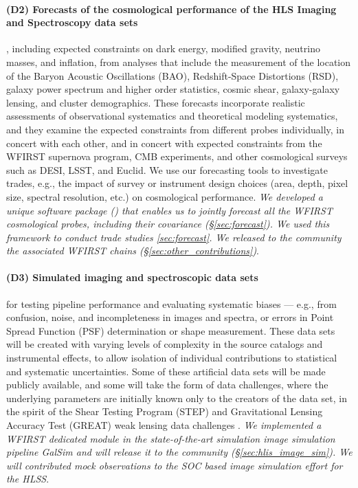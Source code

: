 \paragraph*{(D2) Forecasts of the cosmological performance of the HLS Imaging
and Spectroscopy data sets}, including expected constraints on dark energy,
modified gravity, neutrino masses, and inflation, from analyses that include the
measurement of the location of the Baryon Acoustic Oscillations (BAO),
Redshift-Space Distortions (RSD), galaxy power spectrum and higher order
statistics, cosmic shear, galaxy-galaxy lensing, and cluster demographics. These
forecasts incorporate realistic assessments of observational systematics and
theoretical modeling systematics, and they examine the expected constraints from
different probes individually, in concert with each other, and in concert with
expected constraints from the WFIRST supernova program, CMB experiments, and
other cosmological surveys such as DESI, LSST, and Euclid. We use our
forecasting tools to investigate trades, e.g., the impact of survey or
instrument design choices (area, depth, pixel size, spectral resolution, etc.)
on cosmological performance. \emph{We developed a unique software package (\CoLi) that
enables us to jointly forecast all the WFIRST cosmological probes, including
their covariance (\S \ref{sec:forecast}). We used this framework to conduct trade studies \ref{sec:forecast}. We released to the community the
associated WFIRST chains (\S \ref{sec:other_contributions})}.

\paragraph*{(D3) Simulated imaging and spectroscopic data sets} for testing pipeline
performance and evaluating systematic biases --- e.g., from confusion,
noise, and incompleteness in images and spectra, or errors in Point
Spread Function (PSF) determination or shape measurement.
These data sets will be created with varying levels of complexity
in the source catalogs and instrumental effects, to allow isolation
of individual contributions to statistical and systematic uncertainties.
Some of these artificial data sets will be made publicly available,
and some will take the form of data challenges, where the underlying
parameters are initially known only to the creators of the data set,
in the spirit of the Shear Testing Program (STEP) and Gravitational
Lensing Accuracy Test (GREAT) weak lensing data
challenges \cite{Heymans2006, Massey2007, Bridle2010, Kitching2012, Mandelbaum2015}. \emph{We implemented a WFIRST dedicated module in the state-of-the-art simulation image simulation pipeline GalSim and will release it to the community (\S \ref{sec:hlis_image_sim}). We will contributed mock observations to the SOC based image simulation effort for the HLSS}.

